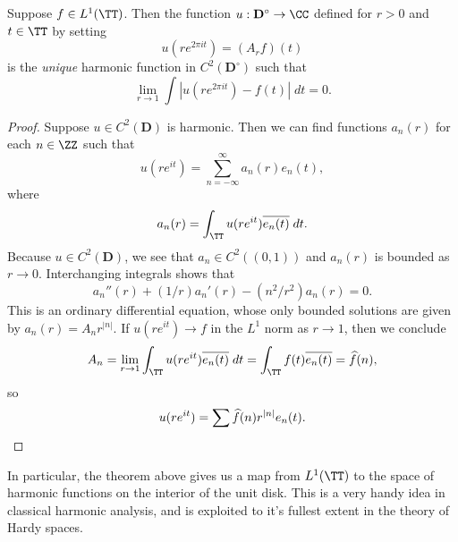 \begin{theorem}
    Suppose $f \in L^1(\TT)$. Then the function $u: \mathbf{D}^\circ \to \CC$ defined for $r > 0$ and $t \in \TT$ by setting
    \[ u(r e^{2 \pi i t}) = (A_r f)(t) \]
    is the \emph{unique} harmonic function in $C^2(\mathbf{D}^\circ)$ such that
    \[ \lim_{r \to 1} \int \left| u(re^{2 \pi i t}) - f(t) \right|\; dt = 0. \]
\end{theorem}
\begin{proof}
    Suppose $u \in C^2(\mathbf{D})$ is harmonic. Then we can find functions $a_n(r)$ for each $n \in \ZZ$ such that
    \[ u(re^{it}) = \sum_{n = -\infty}^\infty a_n(r) e_n(t), \]
    where
    \[ a_n(r) = \int_{\TT} u(re^{it}) \overline{e_n(t)}\; dt. \]
    Because $u \in C^2(\mathbf{D})$, we see that $a_n \in C^2((0,1))$ and $a_n(r)$ is bounded as $r \to 0$. Interchanging integrals shows that
    \[ a_n''(r) + (1/r) a_n'(r) - (n^2/r^2) a_n(r) = 0. \]
    This is an ordinary differential equation, whose only bounded solutions are given by $a_n(r) = A_n r^{|n|}$. If $u(re^{it}) \to f$ in the $L^1$ norm as $r \to 1$, then we conclude
    \[ A_n = \lim_{r \to 1} \int_{\TT} u(re^{it}) \overline{e_n(t)}\; dt = \int_{\TT} f(t) \overline{e_n(t)} = \widehat{f}(n), \]
    so
    \[ u(re^{it}) = \sum \widehat{f}(n) r^{|n|} e_n(t). \qedhere \]
\end{proof}

In particular, the theorem above gives us a map from $L^1(\TT)$ to the space of harmonic functions on the interior of the unit disk. This is a very handy idea in classical harmonic analysis, and is exploited to it's fullest extent in the theory of Hardy spaces.



